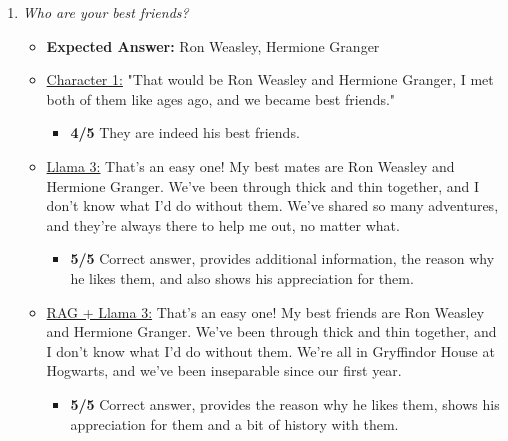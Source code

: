 \documentclass[fleqn,moreauthors,10pt]{ds_report}
\begin{document}
\begin{appendices}
\begin{enumerate}
            \item \textit{Who are your best friends?}
            \begin{itemize}
                \item \textbf{Expected Answer:} Ron Weasley, Hermione Granger
                \item \underline{Character 1:} "That would be Ron Weasley and Hermione Granger, I met both of them like ages ago, and we became best friends."
               \begin{itemize}
                    \item \textbf{4/5} They are indeed his best friends.
                \end{itemize}
                \item \underline{Llama 3:} That's an easy one! My best mates are Ron Weasley and Hermione Granger. We've been through thick and thin together, and I don't know what I'd do without them. We've shared so many adventures, and they're always there to help me out, no matter what.
                \begin{itemize}
                    \item \textbf{5/5} Correct answer, provides additional information, the reason why he likes them, and also shows his appreciation for them.
                \end{itemize}
                \item \underline{RAG + Llama 3:} That's an easy one! My best friends are Ron Weasley and Hermione Granger. We've been through thick and thin together, and I don't know what I'd do without them. We're all in Gryffindor House at Hogwarts, and we've been inseparable since our first year.
                \begin{itemize}
                    \item \textbf{5/5} Correct answer, provides  the reason why he likes them, shows his appreciation for them and a bit of history with them.
                \end{itemize}
            \end{itemize}
        

\end{enumerate}
\end{appendices}
\end{document}
